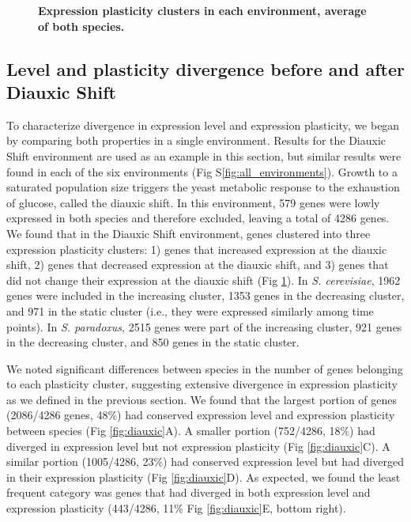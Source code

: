 \begin{figure}
    \centering
    \caption{\textbf{Expression plasticity clusters in each environment, average of both species.}}
    \label{fig:clusters}
\end{figure}

\subsection{Level and plasticity divergence before and after Diauxic Shift}

To characterize divergence in expression level and expression plasticity, we began by comparing both properties in a single environment. Results for the Diauxic Shift environment are used as an example in this section, but similar results were found in each of the six environments (Fig S\ref{fig:all_environments}). Growth to a saturated population size triggers the yeast metabolic response to the exhaustion of glucose, called the diauxic shift. In this environment, 579 genes were lowly expressed in both species and therefore excluded, leaving a total of 4286 genes. We found that in the Diauxic Shift environment, genes clustered into three expression plasticity clusters: 1) genes that increased expression at the diauxic shift, 2) genes that decreased expression at the diauxic shift, and 3) genes that did not change their expression at the diauxic shift (Fig \ref{fig:clusters}). In \textit{S. cerevisiae}, 1962 genes were included in the increasing cluster, 1353 genes in the decreasing cluster, and 971 in the static cluster (i.e., they were expressed similarly among time points). In \textit{S. paradoxus}, 2515 genes were part of the increasing cluster, 921 genes in the decreasing cluster, and 850 genes in the static cluster.

We noted significant differences between species in the number of genes belonging to each plasticity cluster, suggesting extensive divergence in expression plasticity as we defined in the previous section. We found that the largest portion of genes (2086/4286 genes, 48\%) had conserved expression level and expression plasticity between species (Fig \ref{fig:diauxic}A). A smaller portion (752/4286, 18\%) had diverged in expression level but not expression plasticity (Fig \ref{fig:diauxic}C). A similar portion (1005/4286, 23\%) had conserved expression level but had diverged in their expression plasticity (Fig \ref{fig:diauxic}D). As expected, we found the least frequent category was genes that had diverged in both expression level and expression plasticity (443/4286, 11\% Fig \ref{fig:diauxic}E, bottom right).

